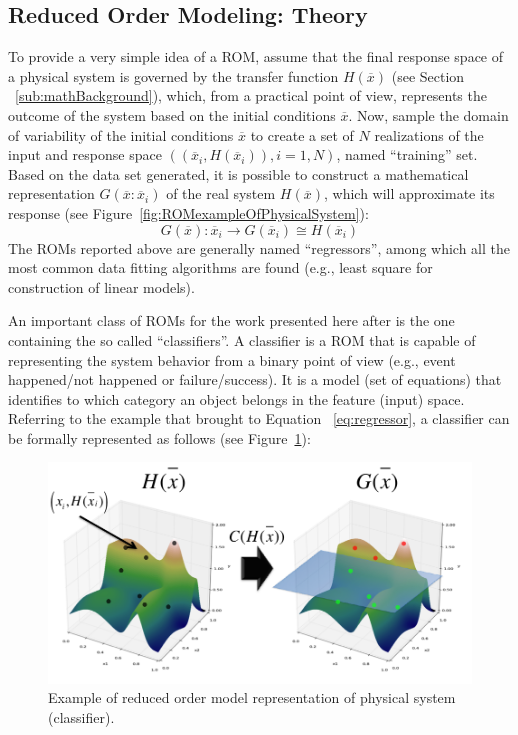 \subsection{Reduced Order Modeling: Theory}
\label{sec:ROMsTheory}
To provide a very simple idea of a ROM, assume that the final 
response space of a physical system is governed by the transfer 
function $H \left (  \overline{x}\right)$ (see Section
~\ref{sub:mathBackground}), which, from a practical point of 
view, represents the outcome of the system based on the initial 
conditions  $\overline{x}$. Now, sample the domain of variability of the 
initial conditions $\overline{x}$ to create a 
set of $N$ realizations of the input and response space $ \left ( \left ( 
\overline{x}_{i}, H \left (  \overline{x}_{i}\right) \right), i=1,N \right)$, 
named ``training'' set. Based on the data set generated, it is possible 
to construct a mathematical representation $G\left ( \overline{x}:
\overline{x}_{i}\right)$ of the 
real system $H \left (  \overline{x}\right)$, which will approximate its 
response (see Figure~\ref{fig:ROMexampleOfPhysicalSystem}):
\begin{equation}
\label{eq:regressor}
G\left ( \overline{x} \right ):\overline{x}_{i} \rightarrow G\left ( \overline{x}_{i} \right ) \cong H\left ( \overline{x}_{i} \right )
\end{equation}
The ROMs reported above are generally named ``regressors'', among 
which all the most common data fitting algorithms are found (e.g., 
least square for construction of linear models).

An important class of ROMs for the work presented here after is the 
one containing the so called ``classifiers''. A classifier is a ROM that is 
capable of representing the system behavior from a binary point of 
view (e.g., event happened/not happened or failure/success). It is a 
model (set of equations) that identifies to which category an object 
belongs in the feature (input) space. Referring to the example that 
brought to Equation ~\ref{eq:regressor}, a classifier can be formally represented as follows (see 
Figure~\ref{fig:ROMClassifierExampleOfPhysicalSystem}):
\begin{figure}[h!]
  \centering
  \includegraphics[width=1.0\textwidth]  {pics/ROMClassifierExampleOfPhysicalSystem.png}
  \caption{Example of reduced order model representation of physical system (classifier).}
  \label{fig:ROMClassifierExampleOfPhysicalSystem}
\end{figure}

